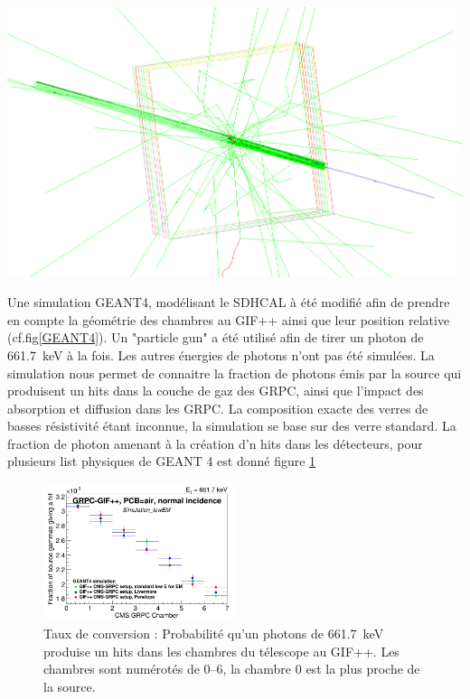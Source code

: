 \marginpar
{
	\centering
	\includegraphics[width=\marginparwidth]{GLA/geant4.png}
	\label{GEANT4}
}

Une simulation GEANT4, modélisant le SDHCAL à été modifié afin de prendre en compte la géométrie des chambres au GIF++ ainsi que leur position relative (cf.fig\ref{GEANT4}). Un "particle gun" a été utilisé afin de tirer un photon de \SI{661.7}{\kilo\eV} à la fois. Les autres énergies de photons n'ont pas été simulées. La simulation nous permet de connaitre la fraction de photons émis par la source qui produisent un hits dans la couche de gaz des GRPC, ainsi que l'impact des absorption et diffusion dans les GRPC. La composition exacte des verres de basses résistivité étant inconnue, la simulation se base sur des verre standard. La fraction de photon amenant à la création d'n hits dans les détecteurs, pour plusieurs list physiques de GEANT 4 est donné figure \ref{conversion}

\begin{figure}[!ht]
	\centering
	\includegraphics[width=0.50\textwidth]{GLA/taux.png}
	\caption{Taux de conversion : Probabilité qu'un photons de \SI{661.7}{\kilo\eV} produise un hits dans les chambres du télescope au GIF++. Les chambres sont numérotés de \SIrange{0}{6}{}, la chambre \num{0} est la plus proche de la source.}
	\label{conversion}
\end{figure}

